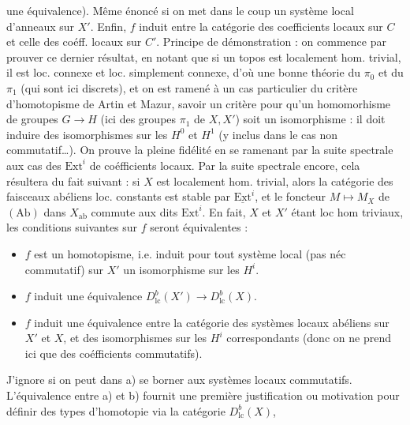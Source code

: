 \documentclass[11pt,a4paper]{article}
\begin{document}
une équivalence). Même énoncé si on met dans le coup un système local
d'anneaux sur $X'$. Enfin, $f$ induit  entre la
catégorie des coefficients locaux sur $C$ et celle des coéff. locaux sur
$C'$. Principe de démonstration : on commence par prouver ce dernier
résultat, en notant que si un topos est localement hom. trivial, il est loc.
connexe et loc. simplement connexe, d'où une bonne théorie du $\pi_0$ et du
$\pi_1$ (qui sont ici discrets), et on est ramené à un cas particulier du
critère d'homotopisme de Artin et Mazur, savoir un critère
 pour qu'un homomorhisme de groupes $G \to H$ (ici des
groupes $\pi_1$ de $X, X'$) soit un isomorphisme : il doit induire des
isomorphismes sur les $H^0$ et $H^1$ (y inclus dans le cas non
commutatif…). On prouve la pleine fidélité en se ramenant par la suite
spectrale aux cas des $\mathrm{Ext}^i$ de coéfficients locaux. Par la suite
spectrale encore, cela résultera du fait suivant : si $X$ est localement
hom. trivial, alors la catégorie des faisceaux abéliens loc. constants est
stable par $\underline{\mathrm{Ext}}^i$, et le foncteur $M \mapsto M_X$ de
$(\mathrm{Ab})$ dans $X_{\mathrm{ab}}$ commute aux dits $\mathrm{Ext}^i$.
En fait, $X$ et $X'$ étant loc hom triviaux, les conditions suivantes sur
$f$ seront équivalentes :

\begin{itemize}
  \item[a)] $f$ est un homotopisme, i.e. induit pour tout système local
  (pas néc commutatif) sur $X'$ un isomorphisme sur les $H^i$.
  \item[b)] $f$ induit une équivalence
  $D^b_{\mathrm{lc}}(X') \to D^b_{\mathrm{lc}}(X)$.
  \item[a')] $f$ induit une équivalence entre la catégorie des systèmes
  locaux abéliens sur $X'$ et $X$, et des isomorphismes sur les $H^i$
  correspondants (donc on ne prend ici que des coéfficients commutatifs).
\end{itemize}

J'ignore si on peut dans a) se borner aux systèmes locaux commutatifs.
L'équivalence entre a) et b) fournit une première justification ou
motivation pour définir des types d'homotopie via la catégorie
$D^b_{\mathrm{lc}}(X)$,
\end{document}
